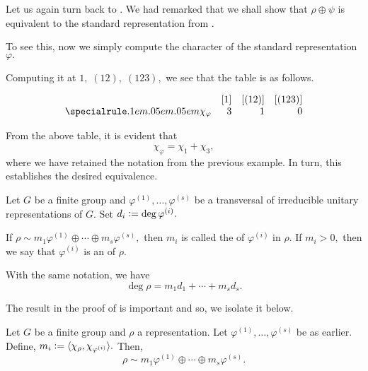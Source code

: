 \begin{ex}
	Let us again turn back to . We had remarked that we shall show that $\rho \oplus \psi$ is equivalent to the standard representation from .

	To see this, now we simply compute the character of the standard representation $\varphi.$

	Computing it at $1,\;(12),\;(123),$ we see that the table is as follows.

	\[\begin{array}{rrrr}
		 & [1] & [(12)] & [(123)]\\
		\thiccline
		\chi_\varphi & 3 & 1 & 0
	\end{array}\]

	From the above table, it is evident that
	\begin{equation*} 
		\chi_\varphi = \chi_1 + \chi_3,
	\end{equation*}
	where we have retained the notation from the previous example. In turn, this establishes the desired equivalence.
\end{ex}

\begin{defn}%
	\label{defn:multiplicity}
	Let $G$ be a finite group and $\varphi^{(1)}, \ldots, \varphi^{(s)}$ be a transversal of irreducible unitary representations of $G.$ Set $d_i \vcentcolon= \deg \varphi^{(i)}.$

	If $\rho \sim m_1\varphi^{(1)} \oplus \cdots \oplus m_s\varphi^{(s)},$ then $m_i$ is called the  of $\varphi^{(i)}$ in $\rho.$ If $m_i > 0,$ then we say that $\varphi^{(i)}$ is an  of $\rho.$
\end{defn}

\begin{rem}
	With the same notation, we have
	\begin{equation*} 
		\deg \rho = m_1d_1 + \cdots + m_sd_s.
	\end{equation*}
\end{rem}

The result in the proof of  is important and so, we isolate it below.

\begin{thm} \label{thm:calcequivfromchar}
	Let $G$ be a finite group and $\rho$ a representation. Let $\varphi^{(1)}, \ldots, \varphi^{(s)}$ be as earlier. Define, $m_i \vcentcolon= \langle \chi_\rho, \chi_{\varphi^{(i)}}\rangle.$ Then,
	\begin{equation*} 
		\rho \sim m_1\varphi^{(1)} \oplus \cdots \oplus m_s\varphi^{(s)}.
	\end{equation*}
\end{thm}

